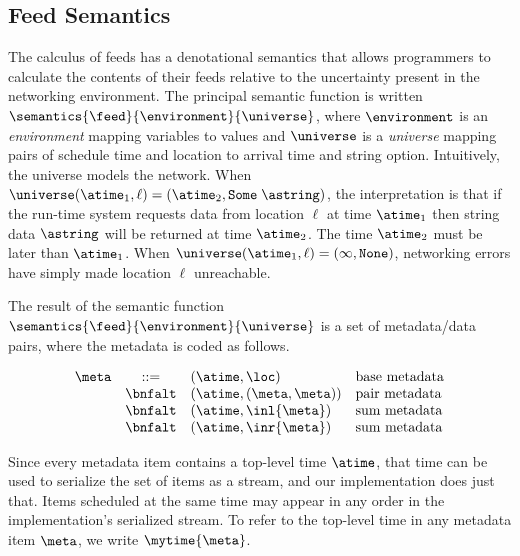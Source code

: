 %

\subsection{Feed Semantics}

The calculus of feeds has a denotational semantics that allows
programmers to calculate the contents of their feeds relative to
the uncertainty present in the networking environment.  The
principal semantic function is written
$\semantics{\feed}{\environment}{\universe}$,
where  $\environment$ is an {\em environment} mapping variables to values
and $\universe$ is a {\em universe} mapping pairs of
schedule time and location to arrival time and string option.
Intuitively, the universe models the network.
When $\universe (\atime_1, \ell) = (\atime_2, \mathtt{Some} \; \astring)$,
 the interpretation is that if the run-time system requests data
from location $\ell$ at time $\atime_1$ then string data $\astring$
will be returned at time $\atime_2$.  The time $\atime_2$ must be
later than $\atime_1$.
When $\universe (\atime_1, \ell) = (\infty, \mathtt{None})$,
networking errors have simply made location $\ell$ unreachable.

The result of the semantic function 
$\semantics{\feed}{\environment}{\universe}$
is a set of metadata/data pairs, where the 
metadata is coded as follows.

\[
\begin{array}{lcll} 
\meta & ::=     
& (\atime,\loc) & \mbox{base metadata} \\
& \bnfalt & (\atime,(\meta,\meta)) & \mbox{pair metadata} \\
& \bnfalt & (\atime,\inl{\meta}) & \mbox{sum metadata} \\
& \bnfalt & (\atime,\inr{\meta}) & \mbox{sum metadata} \\
\end{array}
\]  

Since every metadata item contains a top-level time $\atime$, that
time can be used to serialize the set of items as a stream, and 
our implementation does just that.  Items scheduled at the
same time may appear in any order in the implementation's
serialized stream.  To refer to the top-level time in any metadata
item $\meta$, we write $\mytime{\meta}$. 

